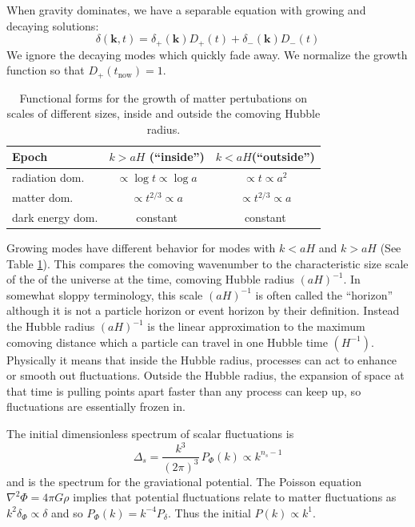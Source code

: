When gravity dominates, we have a separable equation with growing and decaying solutions:
\begin{equation}
   \delta(\mathbf{k},t) =  \delta_+(\mathbf{k}) D_+(t) + \delta_-(\mathbf{k}) D_-(t)
\end{equation}
We ignore the decaying modes which quickly fade away.   We normalize the growth function so that $D_+(t_\textrm{now}) = 1$.

\begin{table}
  \begin{center}
  \begin{tabular}{lcc}
    \hline
    Epoch &  $k > aH$ (``inside'')&  $k < aH$(``outside'') \\
    \hline
    radiation dom. &  $\propto \log t \propto \log a$  &   $\propto t \propto a^2$ \\
    matter dom. & $\propto t^{2/3} \propto a$  &  $\propto t^{2/3} \propto a$ \\
    dark energy dom. & constant & constant \\ \hline 
  \end{tabular}
  \end{center}
  \caption{Functional forms for the growth of matter pertubations on scales of different sizes, inside and outside the comoving Hubble radius.}\label{tab:growth_function}
\end{table}


Growing modes have different behavior for modes with $k < aH$ and $k > aH$ (See Table \ref{tab:growth_function}). This compares the comoving wavenumber to the characteristic size scale of the of the universe at the time, comoving Hubble radius $(aH)^{-1}$.  In somewhat sloppy terminology, this scale $(aH)^{-1}$ is often called the ``horizon'' although it is not a particle horizon or event horizon by their definition.  Instead the Hubble radius $(aH)^{-1}$ is the linear approximation to the maximum comoving distance which a particle can travel in one Hubble time $(H^{-1})$.  Physically it means that inside the Hubble radius, processes can act to enhance or smooth out fluctuations.  Outside the Hubble radius, the expansion of space at that time is pulling points apart faster than any process can keep up, so fluctuations are essentially frozen in.

The initial dimensionless spectrum of scalar fluctuations is
\begin{equation}\Delta_s = \frac{k^3}{(2\pi)^3}\, P_\Phi(k) \propto k^{n_s - 1}\end{equation}
and is the spectrum for the graviational potential.  The Poisson equation $\nabla^2 \Phi = 4\pi G \rho$ implies that potential fluctuations relate to matter fluctuations as $k^2 \delta_\Phi \propto \delta$ and so $P_\Phi(k) = k^{-4} P_\delta$.  Thus the initial $P(k) \propto k^{1}$.

